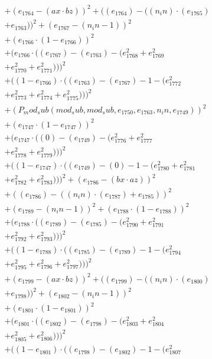 \documentclass[10pt, a4paper]{article}
\begin{document}
\begin{small}
\begin{align*}
& + (e_{1764} - (ax  \cdot  bz))^{2} + ((e_{1764}) - ((n_in)  \cdot  (e_{1765}) \\
& + e_{1763}))^{2} + (e_{1767} - (n_in - 1))^{2} \\
& + (e_{1766}  \cdot  (1 - e_{1766}))^{2} \\
& + (e_{1766}  \cdot  ((e_{1767}) - (e_{1763}) - (e_{1768}^{2} + e_{1769}^{2} \\
& + e_{1770}^{2} + e_{1771}^{2})))^{2} \\
& + ((1 - e_{1766})  \cdot  ((e_{1763}) - (e_{1767}) - 1 - (e_{1772}^{2} \\
& + e_{1773}^{2} + e_{1774}^{2} + e_{1775}^{2})))^{2} \\
& + (P_mod_sub(mod_sub, mod_sub, e_{1750}, e_{1763}, n_in, e_{1749}))^{2} \\
& + (e_{1747}  \cdot  (1 - e_{1747}))^{2} \\
& + (e_{1747}  \cdot  ((0) - (e_{1749}) - (e_{1776}^{2} + e_{1777}^{2} \\
& + e_{1778}^{2} + e_{1779}^{2})))^{2} \\
& + ((1 - e_{1747})  \cdot  ((e_{1749}) - (0) - 1 - (e_{1780}^{2} + e_{1781}^{2} \\
& + e_{1782}^{2} + e_{1783}^{2})))^{2} + (e_{1786} - (bx  \cdot  az))^{2} \\
& + ((e_{1786}) - ((n_in)  \cdot  (e_{1787}) + e_{1785}))^{2} \\
& + (e_{1789} - (n_in - 1))^{2} + (e_{1788}  \cdot  (1 - e_{1788}))^{2} \\
& + (e_{1788}  \cdot  ((e_{1789}) - (e_{1785}) - (e_{1790}^{2} + e_{1791}^{2} \\
& + e_{1792}^{2} + e_{1793}^{2})))^{2} \\
& + ((1 - e_{1788})  \cdot  ((e_{1785}) - (e_{1789}) - 1 - (e_{1794}^{2} \\
& + e_{1795}^{2} + e_{1796}^{2} + e_{1797}^{2})))^{2} \\
& + (e_{1799} - (ax  \cdot  bz))^{2} + ((e_{1799}) - ((n_in)  \cdot  (e_{1800}) \\
& + e_{1798}))^{2} + (e_{1802} - (n_in - 1))^{2} \\
& + (e_{1801}  \cdot  (1 - e_{1801}))^{2} \\
& + (e_{1801}  \cdot  ((e_{1802}) - (e_{1798}) - (e_{1803}^{2} + e_{1804}^{2} \\
& + e_{1805}^{2} + e_{1806}^{2})))^{2} \\
& + ((1 - e_{1801})  \cdot  ((e_{1798}) - (e_{1802}) - 1 - (e_{1807}^{2} \\

\end{align*}
\end{small}
\end{document}
